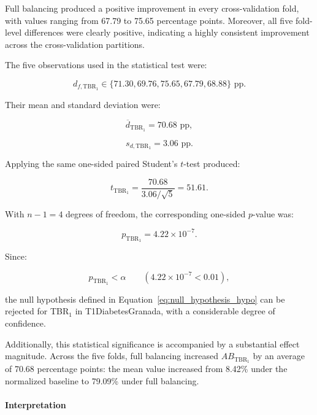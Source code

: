 Full balancing produced a positive improvement in every cross-validation fold, with values ranging from 67.79 to 75.65 percentage points. Moreover, all five fold-level differences were clearly positive, indicating a highly consistent improvement across the cross-validation partitions.

The five observations used in the statistical test were:

\begin{equation}
d_{f,\mathrm{TBR_1}}
\in
\{
71.30,
69.76,
75.65,
67.79,
68.88
\}
\text{ pp}.
\end{equation}

Their mean and standard deviation were:

\begin{equation}
\overline{d}_{\mathrm{TBR_1}}
=
70.68
\text{ pp},
\end{equation}

\begin{equation}
s_{d,\mathrm{TBR_1}}
=
3.06
\text{ pp}.
\end{equation}

Applying the same one-sided paired Student's $t$-test produced:

\begin{equation}
t_{\mathrm{TBR_1}}
=
\frac{70.68}{3.06/\sqrt{5}}
=
51.61.
\end{equation}

With $n-1=4$ degrees of freedom, the corresponding one-sided $p$-value was:

\begin{equation}
p_{\mathrm{TBR_1}}
=
4.22 \times 10^{-7}.
\end{equation}

Since:

\begin{equation}
p_{\mathrm{TBR_1}} < \alpha
\qquad
(4.22 \times 10^{-7} < 0.01),
\end{equation}

the null hypothesis defined in Equation~\ref{eq:null_hypothesis_hypo} can be rejected for TBR$_1$ in T1DiabetesGranada, with a considerable degree of confidence.

Additionally, this statistical significance is accompanied by a substantial effect magnitude. Across the five folds, full balancing increased $AB_{\mathrm{TBR_1}}$ by an average of 70.68 percentage points: the mean value increased from 8.42\% under the normalized baseline to 79.09\% under full balancing.

\paragraph{Interpretation}

